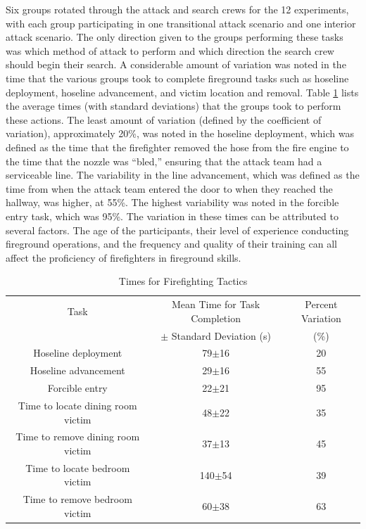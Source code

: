\documentclass[12pt,oneside]{article}
\begin{document}
 Six groups rotated through the attack and search crews for the 12 experiments, with each group participating in one transitional attack scenario and one interior attack scenario. The only direction given to the groups performing these tasks was which method of attack to perform and which direction the search crew should begin their search. A considerable amount of variation was noted in the time that the various groups took to complete fireground tasks such as hoseline deployment, hoseline advancement, and victim location and removal. Table \ref{tab:ff_tasks} lists the average times (with standard deviations) that the groups took to perform these actions. The least amount of variation (defined by the coefficient of variation), approximately 20\%, was noted in the hoseline deployment, which was defined as the time that the firefighter removed the hose from the fire engine to the time that the nozzle was ``bled,'' ensuring that the attack team had a serviceable line. The variability in the line advancement, which was defined as the time from when the attack team entered the door to when they reached the hallway, was higher, at 55\%. The highest variability was noted in the forcible entry task, which was  95\%. The variation in these times can be attributed to several factors. The age of the participants, their level of experience conducting fireground operations, and the frequency and quality of their training can all affect the proficiency of firefighters in fireground skills. 

\begin{table}[!ht]
    \centering
    \caption{Times for Firefighting Tactics}
    \label{tab:ff_tasks}
    \begin{tabular}{ccc}
    \toprule[1.5pt]
 	Task&								Mean Time for Task Completion  	&Percent Variation\\
 		&								$\pm$ Standard Deviation (s)	&	(\%)		\\
 	\midrule 
  	Hoseline deployment					&	79$\pm$16					&	20\\
  	Hoseline advancement				&	29$\pm$16					&	55\\
  	Forcible entry						&	22$\pm$21					&	95\\
  	Time to locate dining room victim 	&	48$\pm$22					&	35\\
  	Time to remove dining room victim 	&	37$\pm$13					&	45\\
  	Time to locate bedroom victim 		&	140$\pm$54					&	39\\
  	Time to remove bedroom victim 		&	60$\pm$38					&	63\\  	
 	\bottomrule[1.25pt] 
    \end{tabular}
\end{table}
\end{document}
